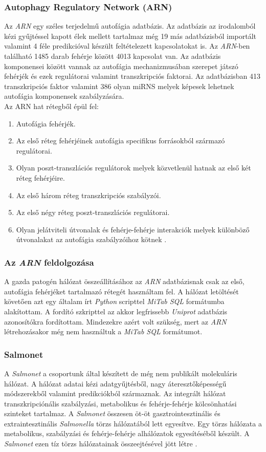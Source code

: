 \documentclass[a4paper,12pt]{article}
\begin{document}
			\subsubsection{Autophagy Regulatory Network (ARN)}
			Az \textit{ARN} egy széles terjedelmű autofágia adatbázis. Az adatbázis az irodalomból kézi gyűjtéssel kapott élek mellett tartalmaz még 19 más adatbázisból importált valamint 4 féle predikcióval készült feltételezett kapcsolatokat is. Az \textit{ARN}-ben található 1485 darab fehérje között 4013 kapcsolat van. Az adatbázis komponensei között vannak az autofágia mechanizmusában szerepet játszó fehérjék és ezek regulátorai valamint transzkripciós faktorai. Az adatbázisban 413 transzkripciós faktor valamint 386 olyan miRNS melyek képesek lehetnek autofágia komponensek szabályzására\cite{ARN}. \\
			Az ARN hat rétegből épül fel:
			\begin{enumerate}
				\item Autofágia fehérjék.
				\item Az első réteg fehérjéinek autofágia specifikus forrásokból származó regulátorai.
				\item Olyan poszt-transzlációs regulátorok melyek közvetlenül hatnak az első két réteg fehérjéire.
				\item Az első három réteg transzkripciós szabályzói.
				\item Az első négy réteg poszt-transzlációs regulátorai.
				\item Olyan jelátviteli útvonalak és fehérje-fehérje interakciók melyek különböző útvonalakat az autofágia szabályzóihoz kötnek \cite{ARN}.
			\end{enumerate}

			\subsubsection{Az \textit{ARN} feldolgozása}
			A gazda patogén hálózat összeállításához az \textit{ARN} adatbázisnak csak az első, autofágia fehérjéket tartalmazó rétegét használtam fel. A hálózat letöltését követően azt egy általam írt \textit{Python} scripttel \textit{MiTab SQL} formátumba alakítottam. A fordító szkripttel az akkor legfrissebb \textit{Uniprot} adatbázis azonosítókra fordítottam. Mindezekre azért volt szükség, mert az \textit{ARN} létrehozásakor még nem használtuk a \textit{MiTab SQL} formátumot.

			\subsubsection{Salmonet}
			A \textit{Salmonet} a csoportunk által készített de még nem publikált molekuláris hálózat. A hálózat adatai kézi adatgyűjtésből, nagy áteresztőképességű módszerekből valamint predikciókból származnak. Az  integrált hálózat transzkripciónális szabályzási, metabolikus és fehérje-fehérje kölcsönhatási szinteket tartalmaz. A \textit{Salmonet} összesen öt-öt gasztrointesztinális és extraintesztinális \textit{Salmonella} törzs hálózatából lett egyesítve. Egy törzs hálózata a metabolikus, szabályzási és fehérje-fehérje alhálózatok egyesítéséből készült. A \textit{Salmonet} ezen tíz törzs hálózatainak összeejtésével jött létre \cite{salmonet}.
\end{document}
